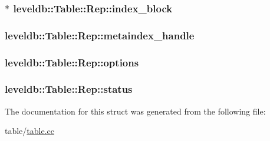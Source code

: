 \hypertarget{structleveldb_1_1_table_1_1_rep_ae69d991c9b8ec7330b22acc06a932fe8}{
\subsubsection[{index\-\_\-block}]{$\ast$ leveldb\-::\-Table\-::\-Rep\-::index\-\_\-block}}\label{structleveldb_1_1_table_1_1_rep_ae69d991c9b8ec7330b22acc06a932fe8}
\hypertarget{structleveldb_1_1_table_1_1_rep_a11500653a2db8ba301bca5027a508789}{
\subsubsection[{metaindex\-\_\-handle}]{ leveldb\-::\-Table\-::\-Rep\-::metaindex\-\_\-handle}}\label{structleveldb_1_1_table_1_1_rep_a11500653a2db8ba301bca5027a508789}
\hypertarget{structleveldb_1_1_table_1_1_rep_a96ff2b389369e1b0706b090961065740}{
\subsubsection[{options}]{ leveldb\-::\-Table\-::\-Rep\-::options}}\label{structleveldb_1_1_table_1_1_rep_a96ff2b389369e1b0706b090961065740}
\hypertarget{structleveldb_1_1_table_1_1_rep_aceaddad6024db9f34af2358503e4c089}{
\subsubsection[{status}]{ leveldb\-::\-Table\-::\-Rep\-::status}}\label{structleveldb_1_1_table_1_1_rep_aceaddad6024db9f34af2358503e4c089}


The documentation for this struct was generated from the following file\-:\begin{DoxyCompactItemize}
\item 
table/\hyperlink{table_8cc}{table.\-cc}\end{DoxyCompactItemize}
